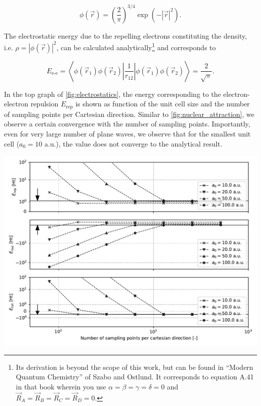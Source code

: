 \begin{equation}
    \phi(\vec{r}) = \left(\frac{2}{\pi} \right)^{3/4} \exp \left(-|\vec{r}|^{2} \right).
\end{equation}

The electrostatic energy due to the repelling electrons constituting the density, i.e. $\rho = |\phi(\vec{r})|^{2}$, can be calculated analytically\footnote{Its derivation is beyond the scope of this work, but can be found in ``Modern Quantum Chemistry'' of Szabo and Ostlund. It corresponds to equation A.41 in that book wherein you use $\alpha=\beta=\gamma=\delta=0$ and $\vec{R}_{A}=\vec{R}_{B}=\vec{R}_{C}=\vec{R}_{D}=0$.} and corresponds to

\begin{equation}
    E_{\text{e-e}} = \left<\phi(\vec{r}_{1})\phi(\vec{r}_{2})\left|\frac{1}{r_{12}}\right|\phi(\vec{r}_{1})\phi(\vec{r}_{2})\right> = \frac{2}{\sqrt{\pi}}.
\end{equation}

In the top graph of \cref{fig:electrostatics}, the energy corresponding to the electron-electron repulsion $E_{\text{rep}}$ is shown as function of the unit cell size and the number of sampling points per Cartesian direction. Similar to \cref{fig:nuclear_attraction}, we observe a certain convergence with the number of sampling points. Importantly, even for very large number of plane waves, we observe that for the smallest unit cell ($a_{0} = 10$ a.u.), the value does not converge to the analytical result.

\begin{Figure}
    \centering
    \includegraphics[width=\linewidth]{img/hartree.pdf}
    \label{fig:electrostatics}
\end{Figure}


